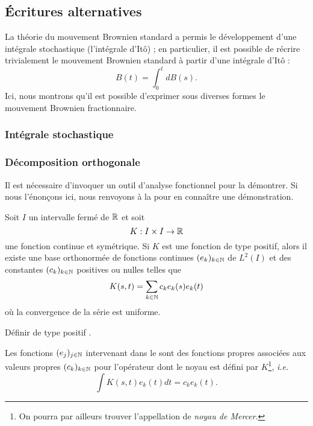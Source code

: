 \subsection{Écritures alternatives}
\label{subsec:fBm-other-forms}

La théorie du mouvement Brownien standard a permis le développement
d'une intégrale stochastique (l'intégrale d'Itô) ; en particulier, il
est possible de récrire trivialement le mouvement Brownien standard à
partir d'une intégrale d'Itô : \[ B(t) = \int_0^t dB(s) .\] Ici, nous
montrons qu'il est possible d'exprimer sous diverses formes le
mouvement Brownien fractionnaire.

\subsubsection*{Intégrale stochastique}

\subsubsection*{Décomposition orthogonale}

Il est nécessaire d'invoquer un outil d'analyse fonctionnel pour la
démontrer. Si nous l'énonçons ici, nous renvoyons à la
 pour en connaître une démonstration.

\begin{theoreme}
  \label{thm:mercers-theorem}
  Soit $I$ un intervalle fermé de $\mathbb{R}$ et soit
  \[ K : I\times I\to \mathbb{R} \] une fonction continue et symétrique. Si
  $K$ est une fonction de type positif, alors il existe une base
  orthonormée de fonctions continues $(e_k)_{k\in\mathbb{N}}$ de $L^2(I)$ et
  des constantes $(c_k)_{k\in\mathbb{N}}$ positives ou nulles telles que
  \begin{equation}
    K(s,t) = \sum_{k\in\mathbb{N}} c_k e_k(s) e_k(t)
  \end{equation}
  où la convergence de la série est uniforme.
\end{theoreme}

\begin{alert}
  Définir \og de type positif \fg{}.
\end{alert}

\begin{remarque}
  Les fonctions $(e_j)_{j\in\mathbb{N}}$ intervenant dans le
   sont des \og fonctions propres\fg{}
  associées aux \og valeurs propres\fg{} $(c_k)_{k\in\mathbb{N}}$ pour
  l'opérateur dont le noyau est défini par $K$\footnote{On pourra par
    ailleurs trouver l'appellation de \emph{noyau de Mercer}.},
  \emph{i.e.}
  \begin{equation*}
    \int K(s,t) e_k(t) dt = c_k e_k(t).
  \end{equation*}
\end{remarque}

